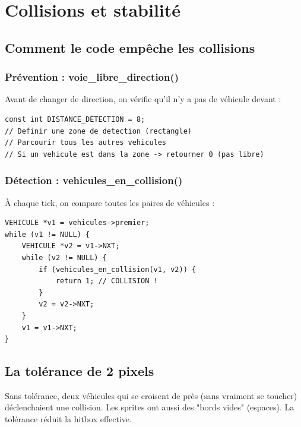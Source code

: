 \documentclass[11pt,a4paper]{article}
\begin{document}
\section{Collisions et stabilité}

\subsection{Comment le code empêche les collisions}

\subsubsection{Prévention : voie\_libre\_direction()}

Avant de changer de direction, on vérifie qu'il n'y a pas de véhicule devant :

\begin{lstlisting}
const int DISTANCE_DETECTION = 8;
// Definir une zone de detection (rectangle)
// Parcourir tous les autres vehicules
// Si un vehicule est dans la zone -> retourner 0 (pas libre)
\end{lstlisting}

\subsubsection{Détection : vehicules\_en\_collision()}

À chaque tick, on compare toutes les paires de véhicules :

\begin{lstlisting}
VEHICULE *v1 = vehicules->premier;
while (v1 != NULL) {
    VEHICULE *v2 = v1->NXT;
    while (v2 != NULL) {
        if (vehicules_en_collision(v1, v2)) {
            return 1; // COLLISION !
        }
        v2 = v2->NXT;
    }
    v1 = v1->NXT;
}
\end{lstlisting}

\subsection{La tolérance de 2 pixels}

\begin{dangerbox}[Pourquoi ?]
Sans tolérance, deux véhicules qui se croisent de près (sans vraiment se toucher) déclenchaient une collision. Les sprites ont aussi des "bords vides" (espaces). La tolérance réduit la hitbox effective.
\end{dangerbox}
\end{document}
